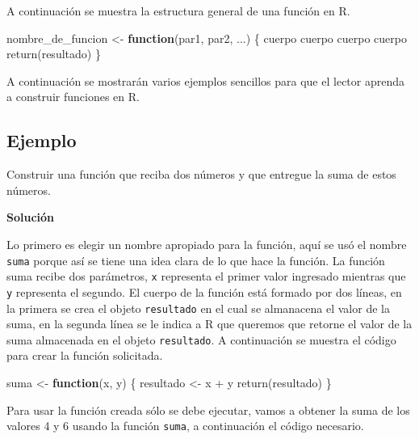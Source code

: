 \documentclass[
]{book}
\makeatletter
\newenvironment{Shaded}{\begin{snugshade}}{\end{snugshade}}
\newcommand{\ControlFlowTok}[1]{\textcolor[rgb]{0.13,0.29,0.53}{\textbf{#1}}}
\newcommand{\FunctionTok}[1]{\textcolor[rgb]{0.00,0.00,0.00}{#1}}
\newcommand{\NormalTok}[1]{#1}
\newcommand{\OtherTok}[1]{\textcolor[rgb]{0.56,0.35,0.01}{#1}}
\newcommand{\SpecialCharTok}[1]{\textcolor[rgb]{0.00,0.00,0.00}{#1}}
\newenvironment{kframe}{%
\medskip{}
\setlength{\fboxsep}{.8em}
 \def\at@end@of@kframe{}%
 \ifinner\ifhmode%
  \def\at@end@of@kframe{\end{minipage}}%
  \begin{minipage}{\columnwidth}%
 \fi\fi%
 \def\FrameCommand##1{\hskip\@totalleftmargin \hskip-\fboxsep
 \colorbox{shadecolor}{##1}\hskip-\fboxsep
     \hskip-\linewidth \hskip-\@totalleftmargin \hskip\columnwidth}%
 \MakeFramed {\advance\hsize-\width
   \@totalleftmargin\z@ \linewidth\hsize
   \@setminipage}}%
 {\par\unskip\endMakeFramed%
 \at@end@of@kframe}
\renewenvironment{Shaded}{\begin{kframe}}{\end{kframe}}
\makeatother
\begin{document}
A continuación se muestra la estructura general de una función en R.

\begin{Shaded}
\begin{Highlighting}[]
\NormalTok{nombre\_de\_funcion }\OtherTok{\textless{}{-}} \ControlFlowTok{function}\NormalTok{(par1, par2, ...) \{}
\NormalTok{  cuerpo}
\NormalTok{  cuerpo}
\NormalTok{  cuerpo}
\NormalTok{  cuerpo}
  \FunctionTok{return}\NormalTok{(resultado)}
\NormalTok{\}}
\end{Highlighting}
\end{Shaded}

A continuación se mostrarán varios ejemplos sencillos para que el lector aprenda a construir funciones en R.

\hypertarget{ejemplo-20}{%
\subsection*{Ejemplo}\label{ejemplo-20}}

Construir una función que reciba dos números y que entregue la suma de estos números.

\textbf{Solución}

Lo primero es elegir un nombre apropiado para la función, aquí se usó el nombre \texttt{suma} porque así se tiene una idea clara de lo que hace la función. La función suma recibe dos parámetros, \texttt{x} representa el primer valor ingresado mientras que \texttt{y} representa el segundo. El cuerpo de la función está formado por dos líneas, en la primera se crea el objeto \texttt{resultado} en el cual se almanacena el valor de la suma, en la segunda línea se le indica a R que queremos que retorne el valor de la suma almacenada en el objeto \texttt{resultado}. A continuación se muestra el código para crear la función solicitada.

\begin{Shaded}
\begin{Highlighting}[]
\NormalTok{suma }\OtherTok{\textless{}{-}} \ControlFlowTok{function}\NormalTok{(x, y) \{}
\NormalTok{  resultado }\OtherTok{\textless{}{-}}\NormalTok{ x }\SpecialCharTok{+}\NormalTok{ y}
  \FunctionTok{return}\NormalTok{(resultado)}
\NormalTok{\}}
\end{Highlighting}
\end{Shaded}

Para usar la función creada sólo se debe ejecutar, vamos a obtener la suma de los valores 4 y 6 usando la función \texttt{suma}, a continuación el código necesario.
\end{document}
